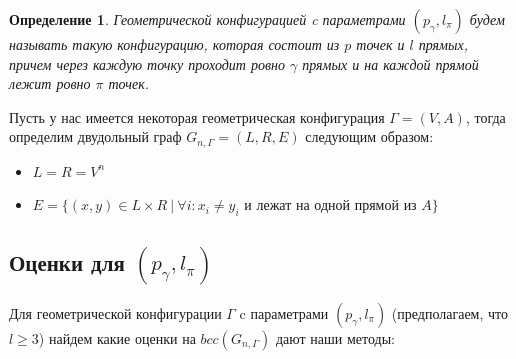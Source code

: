\documentclass[a4paper]{article}
\newtheorem*{mdefinition}{Определение}
\begin{document}
\begin{mdefinition}
    Геометрической конфигурацией c параметрами $(p_{\gamma}, l_{\pi})$ будем называть такую конфигурацию, которая
    состоит из $p$ точек и $l$ прямых, причем через каждую точку проходит ровно $\gamma$ прямых и на 
    каждой прямой лежит ровно $\pi$ точек. 
\end{mdefinition}

Пусть у нас имеется некоторая геометрическая конфигурация $\Gamma = (V, A)$, тогда определим двудольный 
граф $G_{n,\Gamma} = (L, R, E)$ следующим образом:
\begin{itemize}[noitemsep]
    \item $L = R = V^n$
    \item $E = \{(x, y)\in L\times R\ |\ \forall i: x_i \neq y_i$ и лежат на одной прямой из $A\}$
\end{itemize}

\subsection{Оценки для $(p_{\gamma}, l_{\pi})$}

Для геометрической конфигурации $\Gamma$ c параметрами $(p_{\gamma}, l_{\pi})$ (предполагаем, что $l \geq 3$) найдем какие 
оценки на $bcc(G_{n,\Gamma})$ дают наши методы:
\end{document}
